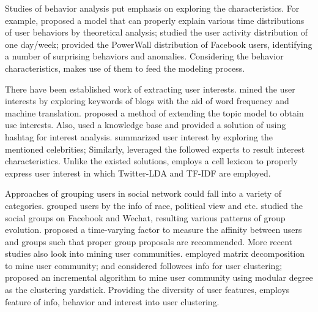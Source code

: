 Studies of behavior analysis put emphasis on exploring the characteristics.
For example, \cite{IEEEexample:jiang2013understanding} proposed a model that can properly explain various time distributions of user behaviors by theoretical analysis;
\cite{IEEEexample:conf/music/GuoLTL12} studied the user activity distribution of one day/week;
\cite{IEEEexample:journals/snam/DevineniKFF17} provided the PowerWall distribution of Facebook users, identifying a number of surprising behaviors and anomalies.
Considering the behavior characteristics, \sys{} makes use of them to feed the modeling process.

There have been established work of extracting user interests.
\cite{IEEEexample:journals/fcsc/LiuCS12} mined the user interests by exploring keywords of blogs with the aid of word frequency and machine translation.
\cite{IEEEexample:conf/webi/XuLXY11} proposed a method of extending the topic model to obtain use interests.
Also, \cite{IEEEexample:conf/and/MichelsonM10} used a knowledge base and \cite{IEEEexample:conf/icde/FengW14} provided a solution of using hashtag for interest analysis.
\cite{IEEEexample:conf/wikis/LimD13} summarized user interest by exploring the mentioned celebrities;
Similarly, \cite{IEEEexample:conf/recsys/BhattacharyaZGGG14} leveraged the followed experts to result interest characteristics.
Unlike the existed solutions, \sys{} employs a cell lexicon to properly express user interest in which Twitter-LDA \cite{IEEEexample:zhao2011comparing} and TF-IDF are employed.

Approaches of grouping users in social network could fall into a variety of categories.
\cite{IEEEexample:conf/icwsm/PennacchiottiP11} grouped users by the info of race, political view and etc.
\cite{IEEEexample:journals/tkdd/ZhangCFLYZY17} studied the social groups on Facebook and Wechat, resulting various patterns of group evolution.
\cite{IEEEexample:conf/aaai/WangDNGEB16} proposed a time-varying factor to measure the affinity between users and groups such that proper group proposals are recommended.
More recent studies also look into mining user communities.
\cite{IEEEexample:conf/wsdm/YangL13} employed matrix decomposition to mine user community;
\cite{IEEEexample:conf/www/RuanFP13} and \cite{IEEEexample:he2014overlapping} considered followees info for user clustering;
\cite{IEEEexample:conf/aaai/ShiokawaFO13} proposed an incremental algorithm to mine user community using modular degree as the clustering yardstick.
Providing the diversity of user features, \sys{} employs feature of info, behavior and interest into user clustering.

